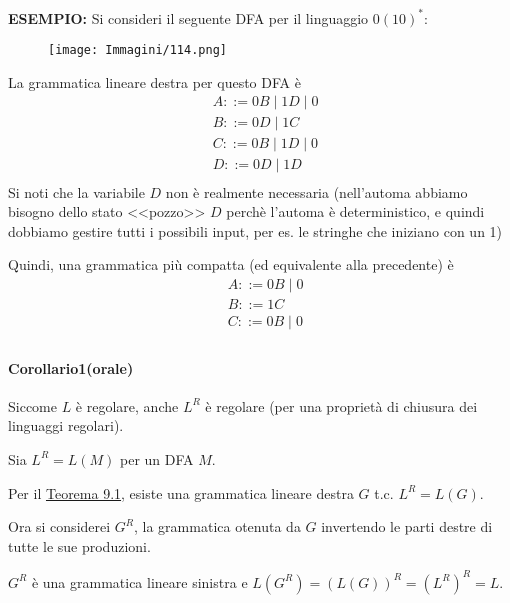 \documentclass{article}
\begin{document}
\textbf{ESEMPIO:} Si consideri il seguente DFA per il linguaggio $0(10)^*$:

\begin{figure}[H]
    \centering
    \texttt{[image: Immagini/114.png]}
    \label{fig:dfa_example} 
\end{figure}

La grammatica lineare destra per questo DFA è
\begin{align*}
    &A ::= 0B \mid 1D \mid 0 \\
    &B ::= 0D \mid 1C \\
    &C ::= 0B \mid 1D \mid 0 \\
    &D ::= 0D \mid 1D \\
\end{align*}
Si noti che la variabile $D$ non è realmente necessaria (nell'automa abbiamo bisogno dello stato <<pozzo>> $D$ perchè l'automa è deterministico, e quindi dobbiamo gestire tutti i possibili input, per es. le stringhe che iniziano con un 1)

Quindi, una grammatica più compatta (ed equivalente alla precedente) è 
\begin{align*}
    &A ::= 0B \mid 0 \\
    &B ::= 1C \\
    &C ::= 0B \mid 0 \\
\end{align*}

\clearpage
\paragraph{Corollario1(orale)}
\label{corollario-9.1}
\text{}
\newline
\begin{tcolorbox}[colback=blue!10!white, colframe=blue!50!black, title=Dimostrazione]
    Siccome $L$ è regolare, anche $L^R$ è regolare (per una proprietà di chiusura dei linguaggi regolari).

    Sia $L^R = L(M)$ per un DFA $M$.
    
    Per il \hyperref[teorema-9.1]{Teorema 9.1}, esiste una grammatica lineare destra $G$ t.c. $L^R = L(G)$.
    
    Ora si considerei $G^R$, la grammatica otenuta da $G$ invertendo le parti destre di tutte le sue produzioni.

    $G^R$ è una grammatica lineare sinistra e $L(G^R) = (L(G))^R = (L^R)^R = L$.
\end{tcolorbox}
\end{document}
